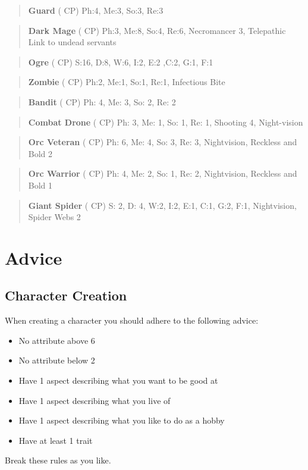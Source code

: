 \documentclass[11pt]{article}
\begin{document}
{\begin{quote}
\textbf{Guard} ( CP)
Ph:4, Me:3, So:3, Re:3
\end{quote}

\begin{quote}
\textbf{Dark Mage} ( CP)
Ph:3, Me:8, So:4, Re:6, Necromancer 3, Telepathic Link to undead servants
\end{quote}

\begin{quote}
\textbf{Ogre} ( CP)
S:16, D:8, W:6, I:2, E:2 ,C:2, G:1, F:1
\end{quote}

\begin{quote}
\textbf{Zombie} ( CP)
Ph:2, Me:1, So:1, Re:1, Infectious Bite
\end{quote}

\begin{quote}
\textbf{Bandit} ( CP)
Ph: 4, Me: 3, So: 2, Re: 2
\end{quote}

\begin{quote}
\textbf{Combat Drone} ( CP)
Ph: 3, Me: 1, So: 1, Re: 1, Shooting 4, Night-vision
\end{quote}

\begin{quote}
\textbf{Orc Veteran} ( CP)
Ph: 6, Me: 4, So: 3, Re: 3, Nightvision, Reckless and Bold 2
\end{quote}

\begin{quote}
\textbf{Orc Warrior} ( CP)
Ph: 4, Me: 2, So: 1, Re: 2, Nightvision, Reckless and Bold 1
\end{quote}

\begin{quote}
\textbf{Giant Spider} ( CP)
S: 2, D: 4, W:2, I:2, E:1, C:1, G:2, F:1, Nightvision, Spider Webs 2
\end{quote}


\newpage

\section{Advice}
\label{sec:org0ee9744}
\subsection{Character Creation}
\label{sec:org29f1406}

When creating a character you should adhere to the following advice:
\begin{itemize}
\item No attribute above 6
\item No attribute below 2
\item Have 1 aspect describing what you want to be good at
\item Have 1 aspect describing what you live of
\item Have 1 aspect describing what you like to do as a hobby
\item Have at least 1 trait
\end{itemize}
Break these rules as you like.


}
\end{document}
